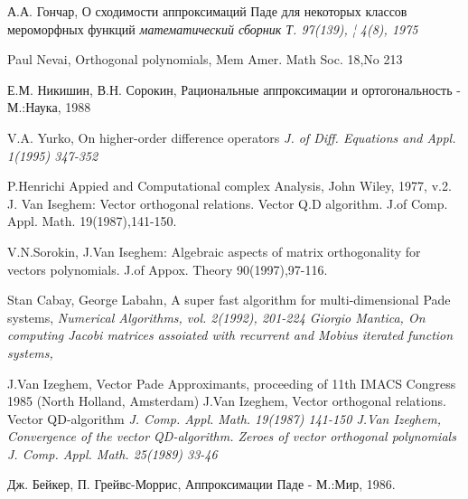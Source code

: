 \begin{thebibliography}{99}
 А.А. Гончар, О сходимости аппроксимаций Паде
для некоторых классов мероморфных функций \it математический
сборник \rm Т. 97(139), ¦ 4(8), 1975





 Paul Nevai, Orthogonal polynomials, Mem Amer. Math Soc. 18,No 213



 Е.М. Никишин, В.Н. Сорокин, Рациональные аппроксимации и
ортогональность - М.:Наука, 1988

 V.A. Yurko, On higher-order difference operators \it J. of Diff. Equations
and Appl. \rm 1(1995) 347-352

 P.Henrichi Appied and Computational complex Analysis,
John Wiley, 1977, v.2.
 J. Van Iseghem: Vector orthogonal relations. Vector Q.D
 algorithm. J.of Comp. Appl. Math. 19(1987),141-150.

V.N.Sorokin, J.Van Iseghem: Algebraic aspects of matrix
orthogonality for vectors polynomials. J.of Appox. Theory
90(1997),97-116.






 Stan Cabay, George Labahn, A super fast algorithm for multi-dimensional Pade systems,
\it Numerical Algorithms, \rm vol. 2(1992), 201-224
 Giorgio Mantica, On computing Jacobi matrices assoiated with recurrent and Mobius iterated function systems,

 J.Van Izeghem, Vector Pade Approximants, proceeding of 11th IMACS Congress 1985 (North Holland, Amsterdam)
 J.Van Izeghem, Vector orthogonal relations. Vector QD-algorithm
\it J. Comp. Appl. Math. \rm 19(1987) 141-150
 J.Van Izeghem, Convergence of the vector QD-algorithm.
Zeroes of vector orthogonal polynomials \it J. Comp. Appl. Math.
\rm 25(1989) 33-46



 Дж. Бейкер, П. Грейвс-Моррис, Аппроксимации Паде - М.:Мир, 1986.


\end{thebibliography}

